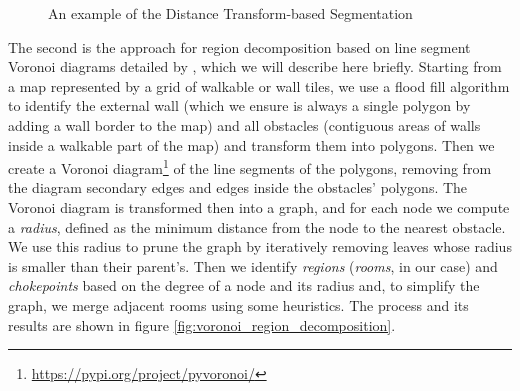 \begin{figure}[H]
    \centering
    \qquad
    \caption[Distance Transform Segmentation example]{An example of the Distance Transform-based Segmentation}
    \label{fig:dt_segmentation}
\end{figure}

The second is the approach for region decomposition based on line segment Voronoi diagrams detailed by \citet{perkins_terrain_2010}, which we will describe here briefly. Starting from a map represented by a grid of walkable or wall tiles, we use a flood fill algorithm to identify the external wall (which we ensure is always a single polygon by adding a wall border to the map) and all obstacles (contiguous areas of walls inside a walkable part of the map) and transform them into polygons. Then we create a Voronoi diagram\footnote{\raggedright\url{https://pypi.org/project/pyvoronoi/}} of the line segments of the polygons, removing from the diagram secondary edges and edges inside the obstacles' polygons. The Voronoi diagram is transformed then into a graph, and for each node we compute a \textit{radius}, defined as the minimum distance from the node to the nearest obstacle. We use this radius to prune the graph by iteratively removing leaves whose radius is smaller than their parent's. Then we identify \textit{regions} (\textit{rooms}, in our case) and \textit{chokepoints} based on the degree of a node and its radius and, to simplify the graph, we merge adjacent rooms using some heuristics. The process and its results are shown in figure \cref{fig:voronoi_region_decomposition}.

